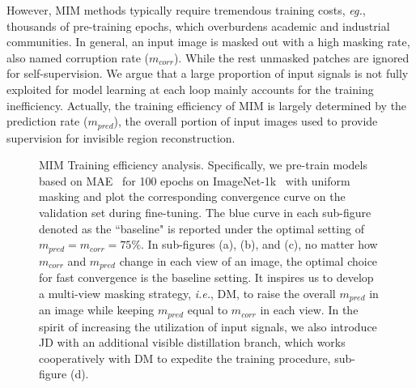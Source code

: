 \documentclass[lettersize,journal]{IEEEtran}
\begin{document}
However, MIM methods typically require tremendous training costs, \textit{eg.}, thousands of pre-training epochs, which overburdens academic and industrial communities. In general, an input image is masked out with a high masking rate, also named corruption rate ($m_{corr}$). While the rest unmasked patches are ignored for self-supervision. We argue that a large proportion of input signals is not fully exploited for model learning at each loop mainly accounts for the training inefficiency. Actually, the training efficiency of MIM is largely determined by the prediction rate ($m_{pred}$), the overall portion of input images used to provide supervision for invisible region reconstruction. 
\begin{figure}[!t]
\centering
{}
\quad
{}
\vspace{4mm}
\caption{MIM Training efficiency analysis. 
Specifically, we pre-train models based on MAE~\cite{2021arXiv211106377H} for 100 epochs on ImageNet-1k~\cite{Deng2009ImageNetAL} with uniform masking and plot the corresponding convergence curve on the validation set during fine-tuning. The blue curve in each sub-figure denoted as the ``baseline" is reported under the optimal setting of $m_{pred}=m_{corr}=75\%$.
In sub-figures (a), (b), and (c), no matter how $m_{corr}$ and $m_{pred}$ change in each view of an image, the optimal choice for fast convergence is the baseline setting. It inspires us to develop a multi-view masking strategy, \textit{i.e.}, DM, to raise the overall $m_{pred}$ in an image while keeping $m_{pred}$ equal to $m_{corr}$ in each view. In the spirit of increasing the utilization of input signals, we also introduce JD with an additional visible distillation branch, which works cooperatively with DM to expedite the training procedure, sub-figure (d).}
\label{fig:motivation}
\end{figure}
\end{document}
